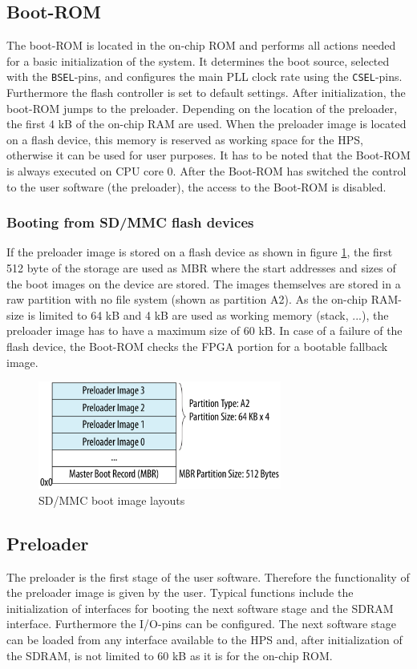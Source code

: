 \subsection{Boot-ROM}
The boot-ROM is located in the on-chip ROM and performs all actions needed for a basic initialization of the system. It determines the boot source, selected with the \texttt{BSEL}-pins, and configures the main PLL clock rate using the \texttt{CSEL}-pins. Furthermore the flash controller is set to default settings. After initialization, the boot-ROM jumps to the preloader. Depending on the location of the preloader, the first 4 kB of the on-chip RAM are used. When the preloader image is located on a flash device, this memory is reserved as working space for the HPS, otherwise it can be used for user purposes. It has to be noted that the Boot-ROM is always executed on CPU core 0. After the Boot-ROM has switched the control to the user software (the preloader), the access to the Boot-ROM is disabled.
\subsubsection{Booting from SD/MMC flash devices}
If the preloader image is stored on a flash device as shown in figure \ref{fig:sdboot}, the first 512 byte of the storage are used as MBR where the start addresses and sizes of the boot images on the device are stored. The images themselves are stored in a raw partition with no file system (shown as partition A2). As the on-chip RAM-size is limited to 64 kB and 4 kB are used as working memory (stack, ...), the preloader image has to have a maximum size of 60 kB. In case of a failure of the flash device, the Boot-ROM checks the FPGA portion for a bootable fallback image. 
\begin{figure}[htbp]
\begin{center}
\includegraphics[width=8cm,keepaspectratio=true]{bilder/png/sdboot}
\caption{SD/MMC boot image layouts\cite[chapter A]{AlteraHPS15}}
\label{fig:sdboot}
\end{center}
\end{figure}
\subsection{Preloader}
The preloader is the first stage of the user software. Therefore the functionality of the preloader image is given by the user. Typical functions include the initialization of interfaces for booting the next software stage and the SDRAM interface. Furthermore the I/O-pins can be configured. The next software stage can be loaded from any interface available to the HPS and, after initialization of the SDRAM, is not limited to 60 kB as it is for the on-chip ROM.
